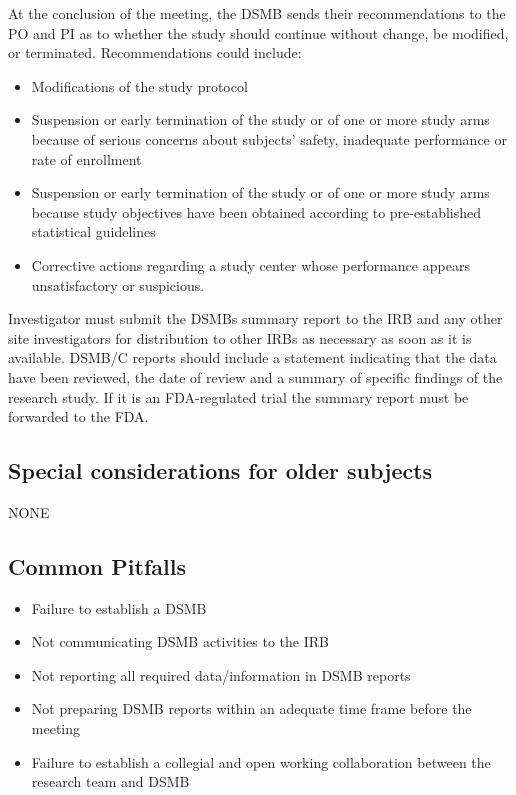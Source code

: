 \documentclass[]{book}
\providecommand{\tightlist}{%
  \setlength{\itemsep}{0pt}\setlength{\parskip}{0pt}}
\begin{document}
At the conclusion of the meeting, the DSMB sends their recommendations
to the PO and PI as to whether the study should continue without change,
be modified, or terminated. Recommendations could include:

\begin{itemize}
\item
  Modifications of the study protocol
\item
  Suspension or early termination of the study or of one or more study
  arms because of serious concerns about subjects' safety, inadequate
  performance or rate of enrollment
\item
  Suspension or early termination of the study or of one or more study
  arms because study objectives have been obtained according to
  pre-established statistical guidelines
\item
  Corrective actions regarding a study center whose performance appears
  unsatisfactory or suspicious.
\end{itemize}

Investigator must submit the DSMBs summary report to the IRB and any
other site investigators for distribution to other IRBs as necessary as
soon as it is available. DSMB/C reports should include a statement
indicating that the data have been reviewed, the date of review and a
summary of specific findings of the research study. If it is an
FDA-regulated trial the summary report must be forwarded to the FDA.

\subsection{Special considerations for older
subjects}\label{special-considerations-for-older-subjects-4}

NONE

\subsection{Common Pitfalls}\label{common-pitfalls-7}

\begin{itemize}
\tightlist
\item
  Failure to establish a DSMB
\item
  Not communicating DSMB activities to the IRB
\item
  Not reporting all required data/information in DSMB reports
\item
  Not preparing DSMB reports within an adequate time frame before the
  meeting
\item
  Failure to establish a collegial and open working collaboration
  between the research team and DSMB
\end{itemize}
\end{document}
